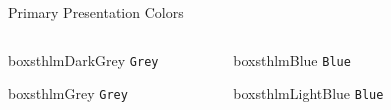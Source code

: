 \documentclass[newPxFont,numfooter,sectionpages]{beamer}
\begin{document}
    
    \begin{frame}[c]{Primary Presentation Colors}
    
    \begin{columns}[c]
    
    \begin{column}{0.12\textwidth}
    \vspace{3em}
    \begin{beamercolorbox}[wd=\linewidth,ht=5ex,dp=3ex]{boxsthlmDarkGrey}
    \centering
        \texttt{Grey}
    \end{beamercolorbox}
    
    \vspace{3em}
    
    \begin{beamercolorbox}[wd=\linewidth,ht=5ex,dp=3ex]{boxsthlmGrey}
    \centering
        \texttt{Grey}
    \end{beamercolorbox}
    
    \end{column}
    
    \begin{column}{0.12\textwidth}
    
    \vspace{3em}
        
    \begin{beamercolorbox}[wd=\linewidth,ht=5ex,dp=3ex]{boxsthlmBlue}
    \centering
        \texttt{Blue}
    \end{beamercolorbox}
    
    \vspace{3em}
    
    \begin{beamercolorbox}[wd=\linewidth,ht=5ex,dp=3ex]{boxsthlmLightBlue}
    \centering
        \texttt{Blue}
    \end{beamercolorbox}
    \end{column}
    
    \begin{column}{0.12\textwidth}
    

\end{column}
\end{columns}
\end{frame}
\end{document}
